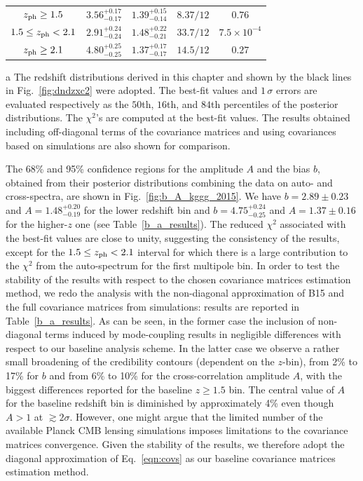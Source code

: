 \begin{table}[t]
\begin{threeparttable}
\begin{tabular}{ccccc}
$z_{\rm{ph}} \ge 1.5$  & $3.56^{+0.17}_{-0.17}$  &  $1.39^{+0.15}_{-0.14}$ & $8.37/12$ & $0.76$ \\
$1.5 \le z_{\rm{ph}} < 2.1$  & $2.91^{+0.24}_{-0.24}$   &  $1.48^{+0.22}_{-0.21}$  & $33.7/12$ & $7.5 \times 10^{-4}$ \\
$z_{\rm{ph}} \ge 2.1$  & $4.80^{+0.25}_{-0.25}$   &  $1.37^{+0.17}_{-0.17}$ & $14.5/12$ & $0.27$ \\
\bottomrule
\end{tabular}
\begin{tablenotes}
\item[a] The redshift distributions derived in this chapter and shown by the black lines in Fig.~\eqref{fig:dndzxc2} were adopted. The best-fit values and $1\,\sigma$ errors are evaluated respectively as the $50$th, $16$th, and $84$th percentiles of the posterior distributions. The $\chi^2$'s are computed at the best-fit values. The results obtained including off-diagonal terms of the covariance matrices and using covariances based on simulations are also shown for comparison.
\end{tablenotes}
\end{threeparttable}
\end{table}


The 68\% and 95\% confidence regions for the amplitude $A$ and the bias $b$, obtained from their posterior distributions combining the data on auto- and cross-spectra, are shown in Fig.~\eqref{fig:b_A_kggg_2015}. We have $b=2.89\pm0.23$ and $A=1.48^{+0.20}_{-0.19}$ for the lower redshift bin and $b=4.75^{+0.24}_{-0.25}$ and  $A=1.37\pm 0.16$ for the higher-$z$ one (see Table~\eqref{b_a_results}). The reduced $\chi^2$ associated with the best-fit values are close to unity, suggesting the consistency of the results, except for the $1.5 \le z_{\rm{ph}} < 2.1$ interval for which there is a large contribution to the $\chi^2$ from the auto-spectrum for the first multipole bin. In order to test the stability of the results with respect to the chosen covariance matrices estimation method, we redo the analysis with the non-diagonal approximation of B15 and the full covariance matrices from simulations: results are reported in Table~\eqref{b_a_results}. As can be seen, in the former case the inclusion of non-diagonal terms induced by mode-coupling results in negligible differences with respect to our baseline analysis scheme. In the latter case we observe a rather small broadening of the credibility contours (dependent on the $z$-bin), from 2\% to 17\% for $b$ and from 6\% to 10\% for the cross-correlation amplitude $A$, with the biggest differences reported for the baseline $z \ge 1.5$ bin. The central value of $A$ for the baseline redshift bin is diminished by approximately 4\% even though $A > 1$ at $\gtrsim 2\sigma$. However, one might argue that the limited number of the available Planck CMB lensing simulations imposes limitations to the covariance matrices convergence. Given the stability of the results, we therefore adopt the diagonal approximation of Eq.~\eqref{eqn:covs} as our baseline covariance matrices estimation method.

